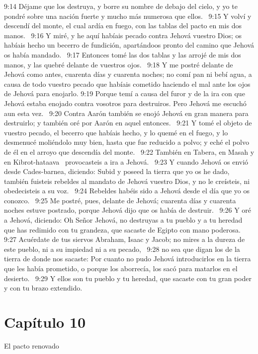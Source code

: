 9:14 Déjame que los destruya, y borre su nombre de debajo del cielo, y yo te pondré sobre una nación fuerte y mucho más numerosa que ellos.  
9:15 Y volví y descendí del monte, el cual ardía en fuego, con las tablas del pacto en mis dos manos.  
9:16 Y miré, y he aquí habíais pecado contra Jehová vuestro Dios; os habíais hecho un becerro de fundición, apartándoos pronto del camino que Jehová os había mandado.  
9:17 Entonces tomé las dos tablas y las arrojé de mis dos manos, y las quebré delante de vuestros ojos.  
9:18 Y me postré delante de Jehová como antes, cuarenta días y cuarenta noches; no comí pan ni bebí agua, a causa de todo vuestro pecado que habíais cometido haciendo el mal ante los ojos de Jehová para enojarlo. 
9:19 Porque temí a causa del furor y de la ira con que Jehová estaba enojado contra vosotros para destruiros. Pero Jehová me escuchó aun esta vez.  
9:20 Contra Aarón también se enojó Jehová en gran manera para destruirlo; y también oré por Aarón en aquel entonces.  
9:21 Y tomé el objeto de vuestro pecado, el becerro que habíais hecho, y lo quemé en el fuego, y lo desmenucé moliéndolo muy bien, hasta que fue reducido a polvo; y eché el polvo de él en el arroyo que descendía del monte.  
9:22 También en Tabera, en Masah y en Kibrot-hataava  provocasteis a ira a Jehová.  
9:23 Y cuando Jehová os envió desde Cades-barnea, diciendo: Subid y poseed la tierra que yo os he dado, también fuisteis rebeldes al mandato de Jehová vuestro Dios, y no le creísteis, ni obedecisteis a su voz.  
9:24 Rebeldes habéis sido a Jehová desde el día que yo os conozco.  
9:25 Me postré, pues, delante de Jehová; cuarenta días y cuarenta noches estuve postrado, porque Jehová dijo que os había de destruir.  
9:26 Y oré a Jehová, diciendo: Oh Señor Jehová, no destruyas a tu pueblo y a tu heredad que has redimido con tu grandeza, que sacaste de Egipto con mano poderosa.  
9:27 Acuérdate de tus siervos Abraham, Isaac y Jacob; no mires a la dureza de este pueblo, ni a su impiedad ni a su pecado,  
9:28 no sea que digan los de la tierra de donde nos sacaste: Por cuanto no pudo Jehová introducirlos en la tierra que les había prometido, o porque los aborrecía, los sacó para matarlos en el desierto.  
9:29 Y ellos son tu pueblo y tu heredad, que sacaste con tu gran poder y con tu brazo extendido.  
\section*{Capítulo 10}
El pacto renovado  

